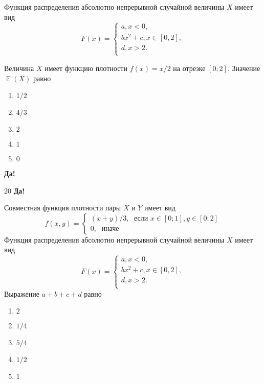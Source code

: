 \documentclass[t]{beamer}
\DeclareMathOperator{\E}{\mathbb{E}}
\begin{document}
 \begin{frame} \label{19-Yes} 
\begin{block}{19} 

Функция распределения абсолютно непрерывной случайной величины $X$ имеет вид
\[
F(x)=\begin{cases}
a, x<0,\\
b x^2+c, x \in [0,2],\\
d, x > 2.\\
\end{cases}
\]
\vspace{0.2cm} 
 
Величина $X$ имеет функцию плотности $f(x)=x/2$ на отрезке $[0;2]$. Значение $\E(X)$  равно
 


 \end{block} 
\begin{enumerate} 
\item[] \hyperlink{19-No}{\beamergotobutton{} $1/2$}
\item[] \hyperlink{19-Yes}{\beamergotobutton{} $4/3$}
\item[] \hyperlink{19-No}{\beamergotobutton{} $2$
}
\item[] \hyperlink{19-No}{\beamergotobutton{} $1$}
\item[] \hyperlink{19-No}{\beamergotobutton{} $0$}
\end{enumerate} 

 \textbf{Да!} 
 \hyperlink{20}{}\end{frame} 


 \begin{frame} \label{20-Yes} 
\begin{block}{20  \textbf{Да!} \hyperlink{21}{}} 

Совместная функция плотности пары $X$ и $Y$ имеет вид
\[
f(x,y)=\begin{cases}
(x+y)/3, \; \text{ если } x\in[0;1], y\in [0;2] \\
0, \; \text{ иначе}
\end{cases}
\] 
Функция распределения абсолютно непрерывной случайной величины $X$ имеет вид
\[
F(x)=\begin{cases}
a, x<0,\\
b x^2+c, x \in [0,2],\\
d, x > 2.\\
\end{cases}
\]
Выражение $a+b+c+d$ равно
 


\end{block} 
\begin{enumerate} 
\item[] \hyperlink{20-No}{\beamergotobutton{} $2$
}
\item[] \hyperlink{20-No}{\beamergotobutton{} $1/4$}
\item[] \hyperlink{20-Yes}{\beamergotobutton{} $5/4$}
\item[] \hyperlink{20-No}{\beamergotobutton{} $1/2$}
\item[] \hyperlink{20-No}{\beamergotobutton{} $1$}
\end{enumerate} 

\end{frame} 
\end{document}
